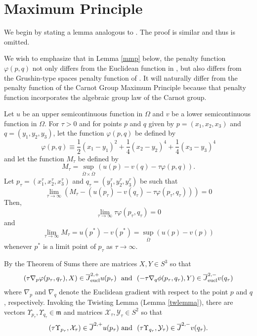 \documentclass[reqno]{amsart}
\newcommand{\eucl}{\operatorname{eucl}}
\begin{document}
\section{Maximum Principle}
We begin by stating a lemma analogous to \cite[Lemma 3.1]{CIL:UGTVS}. The proof is similar and thus is omitted. 

\begin{remark}
We wish to emphasize that in Lemma \ref{mmp} below,  the penalty function $\varphi(p,q)$ not only differs from the Euclidean function in \cite[Lemma 3.1]{CIL:UGTVS}, but also differs from the Grushin-type spaces penalty function of \cite[Lemma 4.1]{B:GS}. It will naturally differ from the penalty function of the Carnot Group Maximum Principle \cite[Lemma 3.6]{B:MP} because that penalty function incorporates the algebraic group law of the Carnot group.

\end{remark}
\begin{lemma}\label{mmp}
Let $u$ be an upper semicontinuous function in $\Omega$ and $v$ be a lower semicontinuous function in $\Omega$. For $\tau>0$ and for points $p$ and $q$ given by $p=(x_1,x_2,x_3)$ and $q=(y_1,y_2,y_3)$, let the function $\varphi(p,q)$ be defined by
\[\varphi(p,q)\equiv\frac{1}{2}(x_1-y_1)^2+\frac{1}{4}(x_2-y_2)^4+\frac{1}{4}(x_3-y_3)^4\]
and let the function $M_\tau$ be defined by
\[M_\tau=\sup_{\overline{\Omega}\times\overline{\Omega}}(u(p)-v(q)-\tau\varphi(p,q)).\]
Let $p_\tau=(x_1^\tau,x_2^\tau,x_3^\tau)$ and $q_\tau=(y_1^\tau,y_2^\tau,y_3^\tau)$ be such that 
\[\lim_{\tau\to\infty}(M_\tau-(u(p_\tau)-v(q_\tau)-\tau\varphi(p_\tau,q_\tau)))=0\]
Then, 
\begin{equation}\lim_{\tau\to\infty}\tau\varphi(p_\tau,q_\tau)=0\end{equation}
and
\begin{equation}\lim_{\tau\to\infty}M_\tau=u(p^*)-v(p^*)=\sup_{\overline\Omega}(u(p)-v(p))\end{equation}
whenever $p^*$ is a limit point of $p_\tau$ as $\tau\to\infty$.
\end{lemma}
By the Theorem of Sums \cite[Theorem 3.2]{CIL:UGTVS}  there are matrices $X,Y\in S^3$ so that 
\begin{eqnarray*}
(\tau \nabla_p\varphi(p_\tau,q_\tau), X)  \in  \overline{J}^{2,+}_{\eucl}u(p_\tau) \ \ 
\textmd{and}\ \ (-\tau\nabla_q\phi(p_\tau,q_\tau), Y) \in  \overline{J}^{2,-}_{\eucl}v(q_\tau)
\end{eqnarray*}
where $\nabla_p$ and $\nabla_q$ denote the Euclidean gradient with respect to the point $p$ and $q$, respectively. Invoking the Twisting Lemma (Lemma \ref{twlemma}), there are vectors $\Upsilon_{p_\tau}, \Upsilon_{q_\tau}\in \mathfrak{m}$ and matrices $\mathcal{X}_\tau, \mathcal{Y}_\tau \in S^2$ so that  
\begin{eqnarray*}
(\tau\Upsilon_{p_\tau},\mathcal{X}_\tau) \in \overline{J}^{2,+}u(p_\tau) \  \textmd{and}\ \ 
(\tau\Upsilon_{q_\tau},\mathcal{Y}_\tau) \in \overline{J}^{2,-}v(q_\tau).
\end{eqnarray*}
\end{document}
